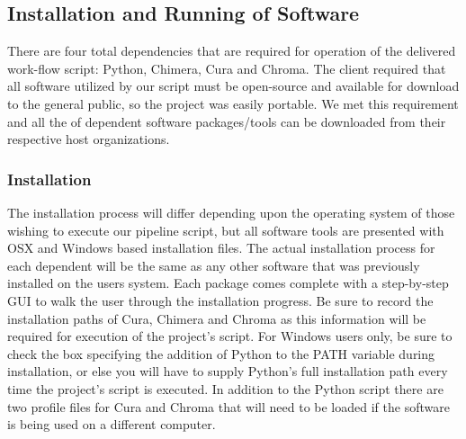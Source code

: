 \documentclass[letterpaper, onecolumn, draftclsnofoot, 10pt, compsoc]{IEEEtran}
\begin{document}
\begin{singlespace}
	\subsection{Installation and Running of Software}
	There are four total dependencies that are required for operation of the delivered work-flow script: Python, Chimera, Cura and Chroma. The client required that all software utilized by our script must be open-source and available for download to the general public, so the project was easily portable. We met this requirement and all the of dependent software packages/tools can be downloaded from their respective host organizations.
	\subsubsection{Installation}
	The installation process will differ depending upon the operating system of those wishing to execute our pipeline script, but all software tools are presented with OSX and Windows based installation files. The actual installation process for each dependent will be the same as any other software that was previously installed on the users system. Each package comes complete with a step-by-step GUI to walk the user through the installation progress. Be sure to record the installation paths of Cura, Chimera and Chroma as this information will be required for execution of the project's script. For Windows users only, be sure to check the box specifying the addition of Python to the PATH variable during installation, or else you will have to supply Python's full installation path every time the project's script is executed. In addition to the Python script there are two profile files for Cura and Chroma that will need to be loaded if the software is being used on a different computer.

\end{singlespace}
\end{document}
